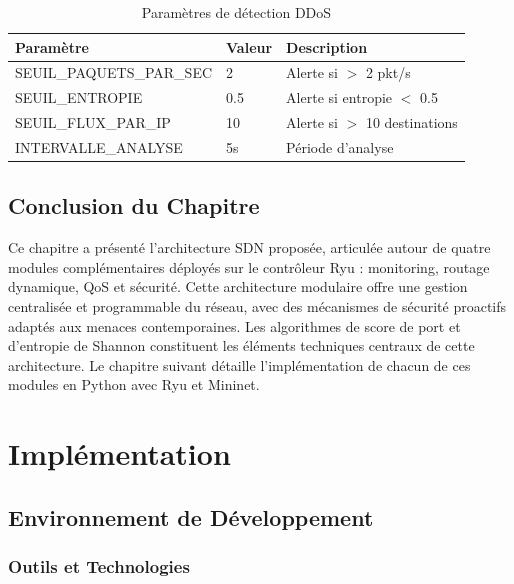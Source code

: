 \documentclass[12pt,a4paper]{report}
\begin{document}
\begin{table}[H]
\centering
\caption{Paramètres de détection DDoS}
\label{tab:params}
\begin{tabular}{lll}
\toprule
\textbf{Paramètre} & \textbf{Valeur} & \textbf{Description} \\
\midrule
SEUIL\_PAQUETS\_PAR\_SEC & 2 & Alerte si $>$ 2 pkt/s \\
SEUIL\_ENTROPIE & 0.5 & Alerte si entropie $<$ 0.5 \\
SEUIL\_FLUX\_PAR\_IP & 10 & Alerte si $>$ 10 destinations \\
INTERVALLE\_ANALYSE & 5s & Période d'analyse \\
\bottomrule
\end{tabular}
\end{table}

\section{Conclusion du Chapitre}
Ce chapitre a présenté l'architecture SDN proposée,
articulée autour de quatre modules complémentaires
déployés sur le contrôleur Ryu : monitoring, routage
dynamique, QoS et sécurité. Cette architecture modulaire
offre une gestion centralisée et programmable du réseau,
avec des mécanismes de sécurité proactifs adaptés aux
menaces contemporaines. Les algorithmes de score de port
et d'entropie de Shannon constituent les éléments
techniques centraux de cette architecture. Le chapitre
suivant détaille l'implémentation de chacun de ces
modules en Python avec Ryu et Mininet.
\newpage

\chapter{Implémentation}

\section{Environnement de Développement}

\subsection{Outils et Technologies}
\end{document}
